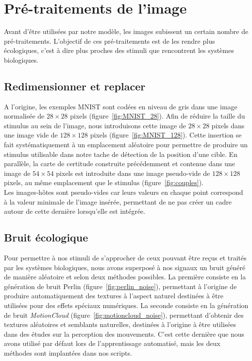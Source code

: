 \section{Pré-traitements de l'image}
Avant d'être utilisées par notre modèle, les images subissent un certain nombre de pré-traitements. 
L'objectif de ces pré-traitements est de les rendre plus écologiques, c'est à dire plus proches des stimuli que rencontrent les systèmes biologiques.

\subsection{Redimensionner et replacer}
A l'origine, les exemples MNIST sont codées en niveau de gris dans une image normalisée de $28\times 28$ pixels (figure~\ref{fig:MNIST_28}).
Afin de réduire la taille du stimulus au sein de l'image, nous introduisons cette image de $28\times 28$ pixels dans une image vide de $128\times 128$ pixels (figure~\ref{fig:MNIST_128}).
Cette insertion se fait systématiquement à un emplacement aléatoire pour permettre de produire un stimulus utilisable dans notre tache de détection de la position d'une cible.
En parallèle, la carte de certitude construite précédemment et contenue dans une image de $54\times 54$ pixels est introduite dans une image pseudo-vide de $128\times 128$ pixels, au même emplacement que le stimulus (figure~\ref{fig:couples}). \\
Les images-hôtes sont pseudo-vides car leurs valeurs en chaque point correspond à la valeur minimale de l'image insérée, permettant de ne pas créer un cadre autour de cette dernière lorsqu'elle est intégrée.

\subsection{Bruit écologique}
Pour permettre à nos stimuli de s'approcher de ceux pouvant être reçus et traités par les systèmes biologiques, nous avons superposé à nos signaux un bruit généré de manière aléatoire et selon deux méthodes possibles.
La première consiste en la génération de bruit Perlin \autocite{Perlin1985} (figure~\ref{fig:perlin_noise}), permettant à l'origine de produire automatiquement des textures à l'aspect naturel destinées à être utilisées pour des effets spéciaux numériques.
La seconde consiste en la génération de bruit \textit{MotionCloud} (figure~\ref{fig:motioncloud_noise}), permettant d'obtenir des textures aléatoires et semblants naturelles, destinées à l'origine à être utilisées dans des études sur la perception des mouvements.
C'est cette dernière que nous avons utilisé par défaut lors de l'apprentissage automatisé, mais les deux méthodes sont implantées dans nos scripts. \autocite{Leon2012}


